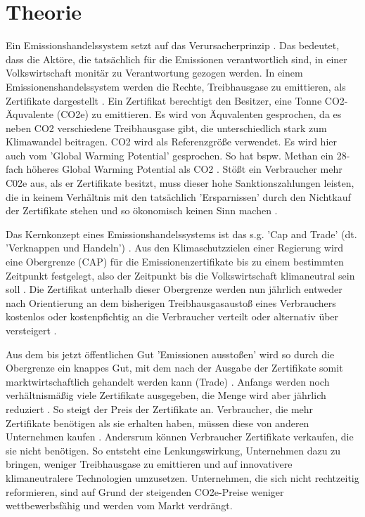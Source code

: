 \chapter{Theorie}

Ein Emissionshandelssystem setzt auf das Verursacherprinzip \cite[S. 161]{hubert.2020}. 
Das bedeutet, dass die Aktöre, die tatsächlich für die Emissionen verantwortlich sind, in einer Volkswirtschaft monitär zu Verantwortung gezogen werden.
In einem Emissionenshandelssystem werden die Rechte, Treibhausgase zu emittieren, als Zertifikate dargestellt \cite[S. 27]{rabe.2018}. 
Ein Zertifikat berechtigt den Besitzer, eine Tonne CO2-Äquvalente (CO2e) zu emittieren. 
Es wird von Äquvalenten gesprochen, da es neben CO2 verschiedene Treibhausgase gibt, die unterschiedlich stark zum Klimawandel beitragen. CO2 wird als Referenzgröße verwendet. 
Es wird hier auch vom 'Global Warming Potential' gesprochen. So hat bspw. Methan ein 28-fach höheres Global Warming Potential als CO2 \cite{ub.2023}.
Stößt ein Verbraucher mehr C02e aus, als er Zertifikate besitzt, muss dieser hohe Sanktionszahlungen leisten, die in keinem Verhältnis mit den tatsächlich 'Ersparnissen' durch den Nichtkauf der Zertifikate stehen und so ökonomisch keinen Sinn machen \cite[S. 181]{hubert.2020}. 

Das Kernkonzept eines Emissionshandelssystems ist das s.g. 'Cap and Trade' (dt. 'Verknappen und Handeln') \cite[S. 134]{rabe.2018}.
Aus den Klimaschutzzielen einer Regierung wird eine Obergrenze (CAP) für die Emissionenzertifikate bis zu einem bestimmten Zeitpunkt festgelegt, also der Zeitpunkt bis die Volkswirtschaft klimaneutral sein soll \cite[S. 181]{hubert.2020}.
Die Zertifikat unterhalb dieser Obergrenze werden nun jährlich entweder nach Orientierung an dem bisherigen Treibhausgasaustoß eines Verbrauchers kostenlos oder kostenpfichtig an die Verbraucher verteilt oder alternativ über versteigert \cite[S. 181]{hubert.2020}. 

Aus dem bis jetzt öffentlichen Gut 'Emissionen ausstoßen' wird so durch die Obergrenze ein knappes Gut, mit dem nach der Ausgabe der Zertifikate somit marktwirtschaftlich gehandelt werden kann (Trade) \cite[S. 17]{hubert.2020}.
Anfangs werden noch verhältnismäßig viele Zertifikate ausgegeben, die Menge wird aber jährlich reduziert \cite[S. 182]{hubert.2020}. So steigt der Preis der Zertifikate an. 
Verbraucher, die mehr Zertifikate benötigen als sie erhalten haben, müssen diese von anderen Unternehmen kaufen \cite[S. 182]{hubert.2020}. 
Andersrum können Verbraucher Zertifikate verkaufen, die sie nicht benötigen. 
So entsteht eine Lenkungswirkung, Unternehmen dazu zu bringen, weniger Treibhausgase zu emittieren und auf innovativere klimaneutralere Technologien umzusetzen. 
Unternehmen, die sich nicht rechtzeitig reformieren, sind auf Grund der steigenden CO2e-Preise weniger wettbewerbsfähig und werden vom Markt verdrängt.

